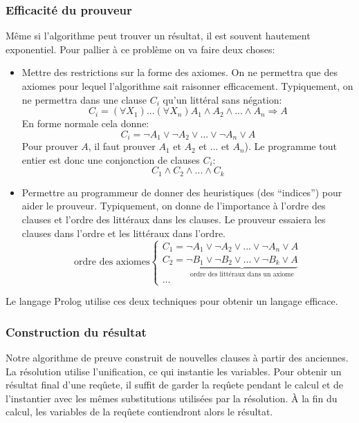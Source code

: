 \subsubsection{Efficacité du prouveur}

Même si l'algorithme peut trouver un résultat, il est souvent hautement exponentiel.
Pour pallier à ce problème on va faire deux choses:
\begin{itemize}
\item Mettre des restrictions sur la forme des axiomes.
On ne permettra que des axiomes pour lequel l'algorithme sait raisonner efficacement.
Typiquement, on ne permettra dans une clause $C_i$ qu'un littéral sans négation:
	$$C_i = (\forall X_{1}) ... (\forall X_{n}) A_{1} \wedge A_{2} \wedge ... \wedge A_{n} \Rightarrow A$$
En forme normale cela donne:
	$$C_{i} = \neg A_{1} \vee \neg A_{2} \vee ... \vee \neg A_{n} \vee A$$
Pour prouver $A$, il faut prouver $A_{1}$ et $A_{2}$ et ... et $A_{n}$).
Le programme tout entier est donc une conjonction de clauses $C_i$:
	$$C_{1} \wedge C_{2} \wedge ... \wedge C_{k}$$
\item Permettre au programmeur de donner des heuristiques (des ``indices'') pour aider le prouveur.
Typiquement, on donne de l'importance à l'ordre des clauses et l'ordre des littéraux dans les clauses.
Le prouveur essaiera les clauses dans l'ordre et les littéraux dans l'ordre.
	$$\text{ordre des axiomes}\left \{
	\begin{array}{l}
	C_{1} = \neg A_{1} \vee \neg A_{2} \vee ... \vee \neg A_{n} \vee A \\
	C_{2} = \underbrace{\neg B_{1} \vee \neg B_{2} \vee ... \vee \neg B_{k} \vee A}_{\text{ordre des littéraux dans un axiome}}\\
	\ldots
	\end{array}
	\right.$$
\end{itemize}
Le langage Prolog utilise ces deux techniques pour obtenir un langage efficace.

\subsubsection{Construction du résultat}

Notre algorithme de preuve construit de nouvelles clauses à partir des anciennes.
La résolution utilise l'unification, ce qui instantie les variables.
Pour obtenir un résultat final d'une reqûete, il suffit de garder la reqûete
pendant le calcul et de l'instantier avec les mêmes substitutions utilisées
par la résolution.
À la fin du calcul, les variables de la reqûete contiendront alors le résultat.

